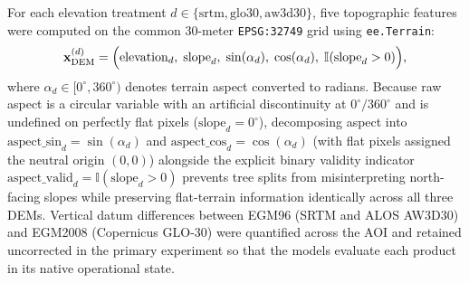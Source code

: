 \documentclass[11pt,twoside]{article}
\begin{document}
For each elevation treatment $d \in \{\text{srtm}, \text{glo30}, \text{aw3d30}\}$, five topographic features were computed on the common 30-meter \texttt{EPSG:32749} grid using \texttt{ee.Terrain}:
\begin{equation}
\mathbf{x}_{\text{DEM}}^{(d)} = \Bigl(\text{elevation}_d,\; \text{slope}_d,\; \sin(\alpha_d),\; \cos(\alpha_d),\; \mathbb{I}(\text{slope}_d > 0)\Bigr),
\label{eq:dem-features}
\end{equation}
where $\alpha_d \in [0^\circ, 360^\circ)$ denotes terrain aspect converted to radians. Because raw aspect is a circular variable with an artificial discontinuity at $0^\circ/360^\circ$ and is undefined on perfectly flat pixels ($\text{slope}_d = 0^\circ$), decomposing aspect into $\text{aspect\_sin}_d = \sin(\alpha_d)$ and $\text{aspect\_cos}_d = \cos(\alpha_d)$ (with flat pixels assigned the neutral origin $(0,0)$) alongside the explicit binary validity indicator $\text{aspect\_valid}_d = \mathbb{I}(\text{slope}_d > 0)$ prevents tree splits from misinterpreting north-facing slopes while preserving flat-terrain information identically across all three DEMs. Vertical datum differences between EGM96 (SRTM and ALOS AW3D30) and EGM2008 (Copernicus GLO-30) were quantified across the AOI and retained uncorrected in the primary experiment so that the models evaluate each product in its native operational state.
\end{document}
